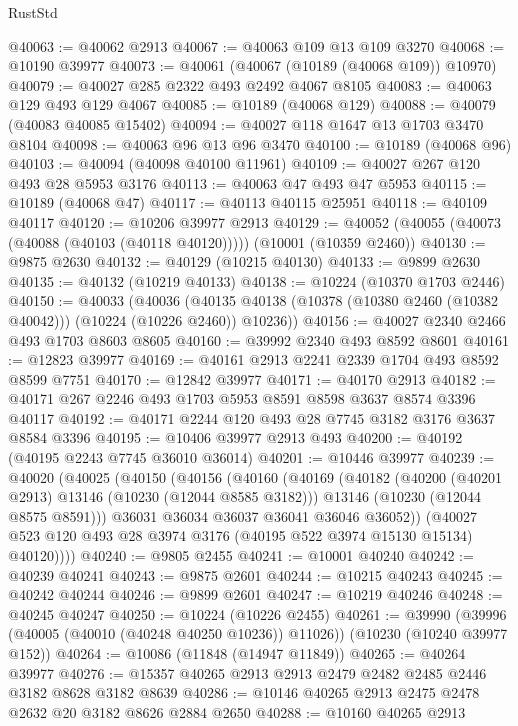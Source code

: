 \begin{lexlean}{RustStd}
\begin{coremodule}
@40063 := @40062 @2913
@40067 := @40063 @109 @13 @109 @3270
@40068 := @10190 @39977
@40073 := @40061 (@40067 (@10189 (@40068 @109)) @10970)
@40079 := @40027 @285 @2322 @493 @2492 @4067 @8105
@40083 := @40063 @129 @493 @129 @4067
@40085 := @10189 (@40068 @129)
@40088 := @40079 (@40083 @40085 @15402)
@40094 := @40027 @118 @1647 @13 @1703 @3470 @8104
@40098 := @40063 @96 @13 @96 @3470
@40100 := @10189 (@40068 @96)
@40103 := @40094 (@40098 @40100 @11961)
@40109 := @40027 @267 @120 @493 @28 @5953 @3176
@40113 := @40063 @47 @493 @47 @5953
@40115 := @10189 (@40068 @47)
@40117 := @40113 @40115 @25951
@40118 := @40109 @40117
@40120 := @10206 @39977 @2913
@40129 := @40052 (@40055 (@40073 (@40088 (@40103 (@40118 @40120))))) (@10001 (@10359 @2460))
@40130 := @9875 @2630
@40132 := @40129 (@10215 @40130)
@40133 := @9899 @2630
@40135 := @40132 (@10219 @40133)
@40138 := @10224 (@10370 @1703 @2446)
@40150 := @40033
    (@40036 (@40135 @40138 (@10378 (@10380 @2460 (@10382 @40042))) (@10224 (@10226 @2460)) @10236))
@40156 := @40027 @2340 @2466 @493 @1703 @8603 @8605
@40160 := @39992 @2340 @493 @8592 @8601
@40161 := @12823 @39977
@40169 := @40161 @2913 @2241 @2339 @1704 @493 @8592 @8599 @7751
@40170 := @12842 @39977
@40171 := @40170 @2913
@40182 := @40171 @267 @2246 @493 @1703 @5953 @8591 @8598 @3637 @8574 @3396 @40117
@40192 := @40171 @2244 @120 @493 @28 @7745 @3182 @3176 @3637 @8584 @3396
@40195 := @10406 @39977 @2913 @493
@40200 := @40192 (@40195 @2243 @7745 @36010 @36014)
@40201 := @10446 @39977
@40239 := @40020
    (@40025
      (@40150
        (@40156
          (@40160
            (@40169
              (@40182
                (@40200 (@40201 @2913) @13146 (@10230 (@12044 @8585 @3182)))
                @13146
                (@10230 (@12044 @8575 @8591)))
              @36031
              @36034
              @36037
              @36041
              @36046
              @36052))
          (@40027 @523 @120 @493 @28 @3974 @3176 (@40195 @522 @3974 @15130 @15134) @40120))))
@40240 := @9805 @2455
@40241 := @10001 @40240
@40242 := @40239 @40241
@40243 := @9875 @2601
@40244 := @10215 @40243
@40245 := @40242 @40244
@40246 := @9899 @2601
@40247 := @10219 @40246
@40248 := @40245 @40247
@40250 := @10224 (@10226 @2455)
@40261 := @39990
    (@39996 (@40005 (@40010 (@40248 @40250 @10236)) @11026))
    (@10230 (@10240 @39977 @152))
@40264 := @10086 (@11848 (@14947 @11849))
@40265 := @40264 @39977
@40276 := @15357 @40265 @2913 @2913 @2479 @2482 @2485 @2446 @3182 @8628 @3182 @8639
@40286 := @10146 @40265 @2913 @2475 @2478 @2632 @20 @3182 @8626 @2884 @2650
@40288 := @10160 @40265 @2913

\end{coremodule}
\end{lexlean}
